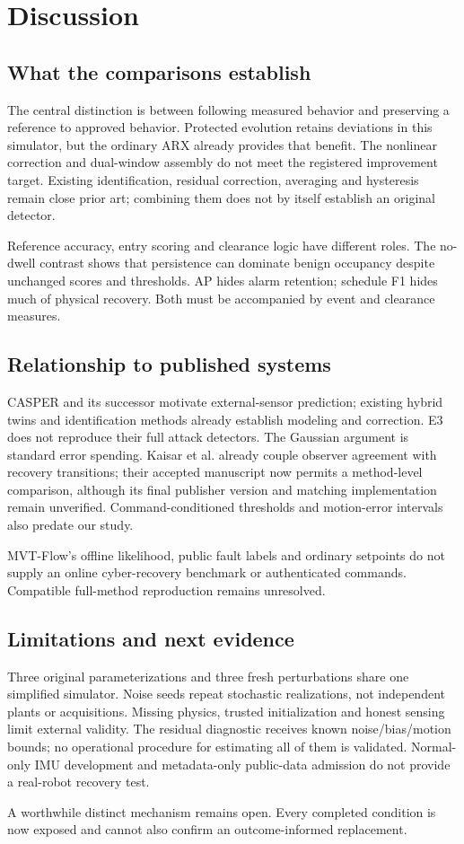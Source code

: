 \section{Discussion}\label{sec:discussion}
\subsection{What the comparisons establish}
The central distinction is between following measured behavior and preserving a reference to approved behavior. Protected evolution retains deviations in this simulator, but the ordinary ARX already provides that benefit. The nonlinear correction and dual-window assembly do not meet the registered improvement target. Existing identification, residual correction, averaging and hysteresis remain close prior art; combining them does not by itself establish an original detector.

Reference accuracy, entry scoring and clearance logic have different roles. The no-dwell contrast shows that persistence can dominate benign occupancy despite unchanged scores and thresholds. AP hides alarm retention; schedule F1 hides much of physical recovery. Both must be accompanied by event and clearance measures.

\subsection{Relationship to published systems}
CASPER and its successor motivate external-sensor prediction; existing hybrid twins and identification methods already establish modeling and correction. E3 does not reproduce their full attack detectors. The Gaussian argument is standard error spending. Kaisar et al. already couple observer agreement with recovery transitions; their accepted manuscript now permits a method-level comparison, although its final publisher version and matching implementation remain unverified. Command-conditioned thresholds and motion-error intervals also predate our study.

MVT-Flow's offline likelihood, public fault labels and ordinary setpoints do not supply an online cyber-recovery benchmark or authenticated commands. Compatible full-method reproduction remains unresolved.

\subsection{Limitations and next evidence}
Three original parameterizations and three fresh perturbations share one simplified simulator. Noise seeds repeat stochastic realizations, not independent plants or acquisitions. Missing physics, trusted initialization and honest sensing limit external validity. The residual diagnostic receives known noise/bias/motion bounds; no operational procedure for estimating all of them is validated. Normal-only IMU development and metadata-only public-data admission do not provide a real-robot recovery test.

A worthwhile distinct mechanism remains open. Every completed condition is now exposed and cannot also confirm an outcome-informed replacement.
